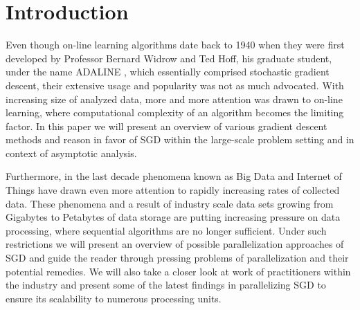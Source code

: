 \section{Introduction}
Even though on-line learning algorithms date back to 1940 when they were first developed by Professor Bernard Widrow and Ted Hoff, his graduate student, under the name ADALINE \cite{adaline}, which essentially comprised stochastic gradient descent, their extensive usage and popularity was not as much advocated. With increasing size of analyzed data, more and more attention was drawn to on-line learning, where computational complexity of an algorithm becomes the limiting factor. In this paper we will present an overview of various gradient descent methods and reason in favor of SGD within the large-scale problem setting and in context of asymptotic analysis.

Furthermore, in the last decade phenomena known as Big Data and Internet of Things have drawn even more attention to rapidly increasing rates of collected data. These phenomena and a result of industry scale data sets growing from Gigabytes to Petabytes of data storage are putting increasing pressure on data processing, where sequential algorithms are no longer sufficient. Under such restrictions we will present an overview of possible parallelization approaches of SGD and guide the reader through pressing problems of parallelization and their potential remedies. We will also take a closer look at work of practitioners within the industry and present some of the latest findings in parallelizing SGD to ensure its scalability to numerous processing units.